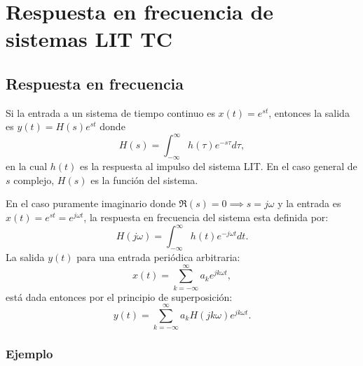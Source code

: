 \chapter{Respuesta en frecuencia de sistemas LIT TC}

\section{Respuesta en frecuencia}

Si la entrada a un sistema de tiempo continuo es $x(t) = e^{st}$, entonces la salida es $y(t) = H(s) e^{st}$ donde
\begin{equation}
	H(s) = \int_{-\infty}^{\infty} h(\tau) e^{-s\tau} d\tau,
\end{equation}
en la cual $h(t)$ es la respuesta al impulso del sistema LIT. En el caso general de $s$ complejo, $H(s)$ es la funci\'{o}n del sistema. 

En el caso puramente imaginario donde $\Re(s) = 0 \implies s = j\omega$ y la entrada es $x(t) = e^{st} = e^{j\omega t}$, la respuesta en frecuencia del sistema esta definida por:
\begin{equation}
	H(j\omega) = \int_{-\infty}^{\infty} h(t) e^{-j\omega t} dt.
\end{equation}
La salida $y(t)$ para una entrada peri\'{o}dica arbitraria:
\begin{equation}
	x(t) = \sum_{k=-\infty}^{\infty} a_{k} e^{jk\omega t},
\end{equation}
est\'{a} dada entonces por el principio de superposici\'{o}n:
\begin{equation}
	y(t) = \sum_{k=-\infty}^{\infty} a_{k} H(jk\omega) e^{jk\omega t}.
\end{equation}

\subsection{Ejemplo}

